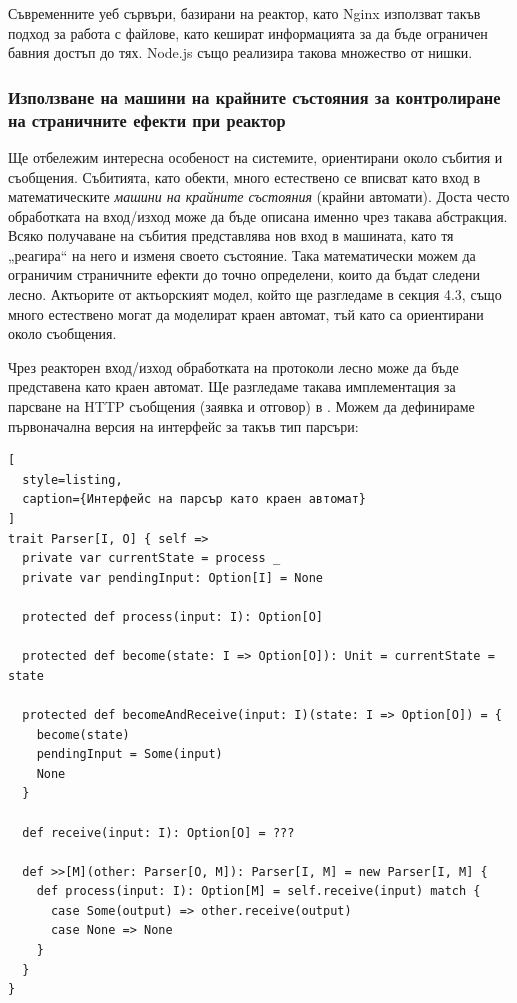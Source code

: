Съвременните уеб сървъри, базирани на реактор, като Nginx използват такъв подход за работа с файлове, като кешират информацията за да бъде ограничен бавния достъп до тях. Node.js също реализира такова множество от нишки.

\subsubsection{Използване на машини на крайните състояния за контролиране на страничните ефекти при реактор}

Ще отбележим интересна особеност на системите, ориентирани около събития и съобщения. Събитията, като обекти, много естествено се вписват като вход в математическите \emph{машини на крайните състояния} (крайни автомати). Доста често обработката на вход/изход може да бъде описана именно чрез такава абстракция. Всяко получаване на събития представлява нов вход в машината, като тя „реагира“ на него и изменя своето състояние. Така математически можем да ограничим страничните ефекти до точно определени, които да бъдат следени лесно. Актьорите от актьорският модел, който ще разгледаме в секция 4.3, също много естествено могат да моделират краен автомат, тъй като са ориентирани около съобщения.

Чрез реакторен вход/изход обработката на протоколи лесно може да бъде представена като краен автомат. Ще разгледаме такава имплементация за парсване на HTTP съобщения (заявка и отговор) в . Можем да дефинираме първоначална версия на интерфейс за такъв тип парсъри:

\begin{lstlisting}[
  style=listing,
  caption={Интерфейс на парсър като краен автомат}
]
trait Parser[I, O] { self =>
  private var currentState = process _
  private var pendingInput: Option[I] = None

  protected def process(input: I): Option[O]

  protected def become(state: I => Option[O]): Unit = currentState = state

  protected def becomeAndReceive(input: I)(state: I => Option[O]) = {
    become(state)
    pendingInput = Some(input)
    None
  }

  def receive(input: I): Option[O] = ???

  def >>[M](other: Parser[O, M]): Parser[I, M] = new Parser[I, M] {
    def process(input: I): Option[M] = self.receive(input) match {
      case Some(output) => other.receive(output)
      case None => None
    }
  }
}
\end{lstlisting}

